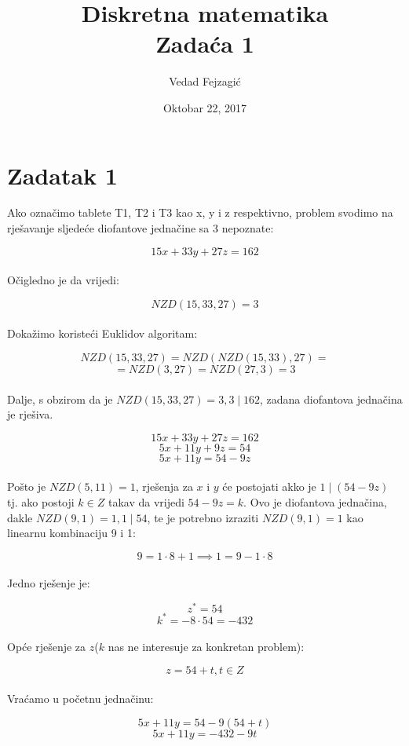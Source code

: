 \documentclass[12pt]{article}
\title{
  Diskretna matematika\\
  \large Zadaća 1 \\}
\author{Vedad Fejzagić}
\date{Oktobar 22, 2017}
\begin{document}
\maketitle

\newpage

\section*{Zadatak 1\label{Z1}}

\hspace{0.65cm}Ako označimo tablete T1, T2 i T3 kao x, y i z respektivno, problem svodimo na rješavanje sljedeće diofantove jednačine sa 3 nepoznate:

$$15x + 33y + 27z = 162$$\\

Očigledno je da vrijedi:

$$NZD(15, 33, 27) = 3$$\\

Dokažimo koristeći Euklidov algoritam:

$$NZD(15, 33, 27) = NZD(NZD(15, 33), 27) =$$ 
$$= NZD(3, 27) = NZD(27, 3) = 3$$\\

Dalje, s obzirom da je $NZD(15, 33, 27) = 3, 3 \mid 162$, zadana diofantova jednačina je rješiva.

$$15x + 33y + 27z = 162$$
$$5x + 11y + 9z = 54$$
$$5x + 11y = 54 - 9z$$\\

Pošto je $NZD(5, 11) = 1$, rješenja za $x$ i $y$ će postojati akko je $1 \mid (54 - 9z)$ tj. ako postoji $k\in Z$ takav da vrijedi $54 - 9z = k$. Ovo je diofantova jednačina, dakle $NZD(9, 1) = 1, 1 \mid 54$, te je potrebno izraziti $NZD(9, 1) = 1$ kao linearnu kombinaciju 9 i 1:

$$9 = 1 \cdot 8 + 1 \implies 1 = 9 - 1 \cdot 8$$\\

Jedno rješenje je:

$$z^{*} = 54$$
$$k^{*} = - 8 \cdot 54 = - 432$$\\

Opće rješenje za $z$($k$ nas ne interesuje za konkretan problem):

$$z = 54 + t, t\in Z$$\\

Vraćamo u početnu jednačinu:

$$5x + 11y = 54 - 9(54 + t)$$
$$5x + 11y = -432 - 9t$$\\
\end{document}
